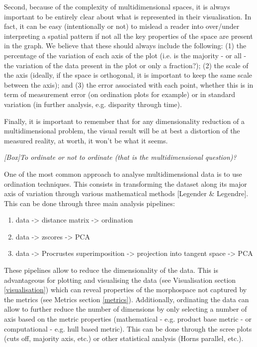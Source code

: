 \documentclass[12pt,letterpaper]{article}
\renewcommand{\subsection}[1]{%
\bigskip
\begin{center}
\begin{large}
\normalfont\itshape #1
\end{large}
\end{center}}
\begin{document}
Second, because of the complexity of multidimensional spaces, it is always important to be entirely clear about what is represented in their visualisation.
In fact, it can be easy (intentionally or not) to mislead a reader into over/under interpreting a spatial pattern if not all the key properties of the space are present in the graph.
We believe that these should always include the following:
(1) the percentage of the variation of each axis of the plot (i.e. is the majority - or all - the variation of the data present in the plot or only a fraction?);
(2) the scale of the axis (ideally, if the space is orthogonal, it is important to keep the same scale between the axis);
and (3) the error associated with each point, whether this is in term of measurement error (on ordination plots for example) or in standard variation (in further analysis, e.g. disparity through time).

Finally, it is important to remember that for any dimensionality reduction of a multidimensional problem, the visual result will be at best a distortion of the measured reality, at worth, it won't be what it seems.


\subsection{[Box]To ordinate or not to ordinate (that is the multidimensional question)?}
\label{box_ordination}
One of the most common approach to analyse multidimensional data is to use ordination techniques.
This consists in transforming the dataset along its major axis of variation through various mathematical methods [Legender \& Legendre].
This can be done through three main analysis pipelines:
\begin{enumerate}
    \item data -> distance matrix -> ordination
    \item data -> zscores -> PCA
    \item data -> Procrustes superimposition -> projection into tangent space -> PCA
\end{enumerate}

These pipelines allow to reduce the dimensionality of the data.
This is advantageous for plotting and visualising the data (see Visualisation section \ref{visualisation}) which can reveal properties of the morphospace not captured by the metrics (see Metrics section \ref{metrics}).
Additionally, ordinating the data can allow to further reduce the number of dimensions by only selecting a number of axis based on the metric properties (mathematical - e.g. product base metric - or computational - e.g. hull based metric).
This can be done through the scree plots (cuts off, majority axis, etc.) or other statistical analysis (Horns parallel, etc.).
\end{document}

